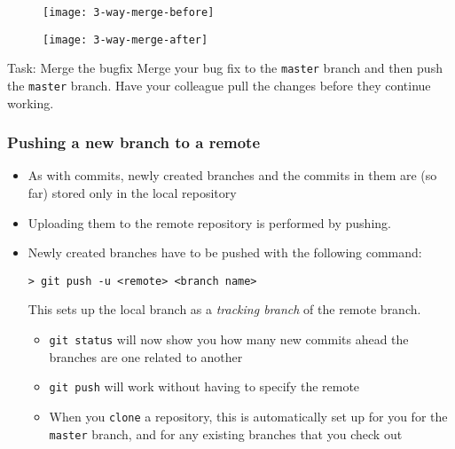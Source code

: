 \begin{frame}[fragile]

\begin{multicols}{2}
	\begin{figure}
		\texttt{[image: 3-way-merge-before]}
	\end{figure}
	\begin{figure}
		\texttt{[image: 3-way-merge-after]}
	\end{figure}
\end{multicols}

	\begin{block}{Task: Merge the bugfix}
	Merge your bug fix to the \texttt{master} branch and then push the \texttt{master} branch. Have your colleague pull the changes before they continue working.
	\end{block}
\end{frame}


\begin{frame}[fragile]

\frametitle{Pushing a new branch to a remote}

	\begin{itemize}
	\item As with commits, newly created branches and the commits in them are (so far) stored only in the local repository
	\item  Uploading them to the remote repository is performed by pushing. 
	\item Newly created branches have to be pushed with the following command:
\begin{verbatim}
> git push -u <remote> <branch name>
\end{verbatim}
	This sets up the local branch as a \textit{tracking branch} of the remote branch.
	\begin{itemize}
	\item \texttt{git status} will now show you how many new commits ahead the branches are one related to another
	\item \texttt{git push} will work without having to specify the remote
	\item When you \texttt{clone} a repository, this is automatically set up for you for the \texttt{master} branch, and for any existing branches that you check out
	\end{itemize}
	\end{itemize}
\end{frame}

